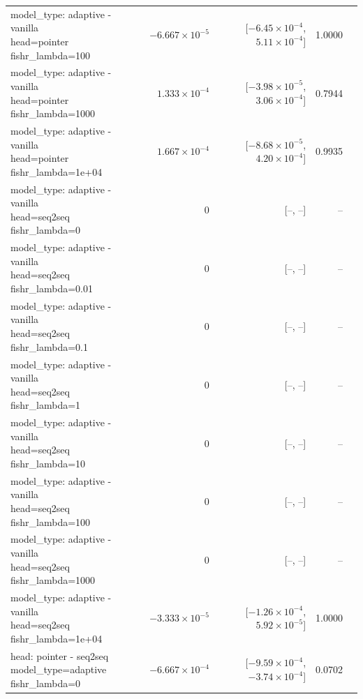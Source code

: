 \documentclass[10pt]{article}
\makeatletter
\newcommand{\stackcell}[1]{\begin{tabular}[t]{@{}l@{}}#1\end{tabular}}
\makeatother
\begin{document}
{\begin{longtable}{lrrrl}
\stackcell{model\_type: adaptive - vanilla\\\footnotesize head=pointer fishr\_lambda=100 } & $-6.667\times10^{-5}$ & [$-6.45\times10^{-4}$, $5.11\times10^{-4}$] & 1.0000 & \\
\stackcell{model\_type: adaptive - vanilla\\\footnotesize head=pointer fishr\_lambda=1000 } & $1.333\times10^{-4}$ & [$-3.98\times10^{-5}$, $3.06\times10^{-4}$] & 0.7944 & \\
\stackcell{model\_type: adaptive - vanilla\\\footnotesize head=pointer fishr\_lambda=1e+04 } & $1.667\times10^{-4}$ & [$-8.68\times10^{-5}$, $4.20\times10^{-4}$] & 0.9935 & \\
\stackcell{model\_type: adaptive - vanilla\\\footnotesize head=seq2seq fishr\_lambda=0 } & 0 & [--, --] & -- & \\
\stackcell{model\_type: adaptive - vanilla\\\footnotesize head=seq2seq fishr\_lambda=0.01 } & 0 & [--, --] & -- & \\
\stackcell{model\_type: adaptive - vanilla\\\footnotesize head=seq2seq fishr\_lambda=0.1 } & 0 & [--, --] & -- & \\
\stackcell{model\_type: adaptive - vanilla\\\footnotesize head=seq2seq fishr\_lambda=1 } & 0 & [--, --] & -- & \\
\stackcell{model\_type: adaptive - vanilla\\\footnotesize head=seq2seq fishr\_lambda=10 } & 0 & [--, --] & -- & \\
\stackcell{model\_type: adaptive - vanilla\\\footnotesize head=seq2seq fishr\_lambda=100 } & 0 & [--, --] & -- & \\
\stackcell{model\_type: adaptive - vanilla\\\footnotesize head=seq2seq fishr\_lambda=1000 } & 0 & [--, --] & -- & \\
\stackcell{model\_type: adaptive - vanilla\\\footnotesize head=seq2seq fishr\_lambda=1e+04 } & $-3.333\times10^{-5}$ & [$-1.26\times10^{-4}$, $5.92\times10^{-5}$] & 1.0000 & \\
\stackcell{head: pointer - seq2seq\\\footnotesize model\_type=adaptive fishr\_lambda=0 } & $-6.667\times10^{-4}$ & [$-9.59\times10^{-4}$, $-3.74\times10^{-4}$] & 0.0702 & \\

\end{longtable}}
\end{document}
